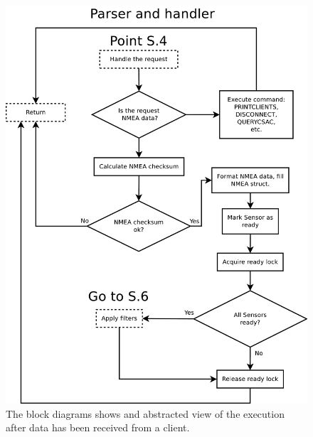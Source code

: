 \documentclass[12pt,english,a4paper]{report}
\begin{document}
\begin{figure}
\centering
  \includegraphics[scale=0.40]{actions_core.pdf}
   \caption[Socket Server execution flow block diagram]{The block diagrams shows and abstracted view of the execution after data has been received from a client.}
   \label{actions_core}
\end{figure}
\end{document}
